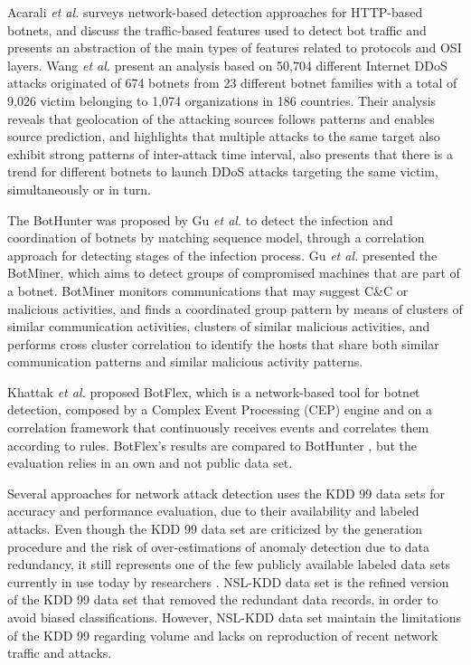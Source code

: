Acarali \emph{et al.} \cite{acarali2016survey} surveys network-based detection approaches for HTTP-based botnets, and discuss the traffic-based features used to detect bot traffic and presents an abstraction of the main types of features related to protocols and OSI layers. Wang \emph{et al.} \cite{Wang2018ddosbotnetssurvey} present an analysis based on 50,704 different Internet DDoS attacks originated of 674 botnets from 23 different botnet families with a total of 9,026 victim belonging to 1,074 organizations in 186 countries. Their analysis reveals that geolocation of the attacking sources follows patterns and enables source prediction, and highlights that multiple attacks to the same target also exhibit strong patterns of inter-attack time interval, also presents that there is a trend for different botnets to launch DDoS attacks targeting the same victim, simultaneously or in turn.

The BotHunter was proposed by Gu \emph{et al.} \cite{gu2007bothunter} to detect the infection and coordination of botnets by matching sequence model, through a correlation approach for detecting stages of the infection process.  Gu \emph{et al.} \cite{gu2008botminer} presented the BotMiner, which aims to detect groups of compromised machines that are part of a botnet. BotMiner monitors communications that may suggest C\&C or malicious activities, and finds a coordinated group pattern by means of clusters of similar communication activities, clusters of similar malicious activities, and performs cross cluster correlation to identify the hosts that share both similar communication patterns and similar malicious activity patterns.

Khattak \emph{et al.} \cite{khattak2015botflex} proposed BotFlex, which is a network-based tool for botnet detection, composed by a Complex Event Processing (CEP) engine and on a correlation framework that continuously receives events and correlates them according to rules. BotFlex's results are compared to BotHunter \cite{gu2007bothunter}, but the evaluation relies in an own and not public data set.

Several approaches for network attack detection uses the KDD 99 \cite{ahmed2016survey,osanaiye2016distributed,bhuyan2014network} data sets for accuracy and performance evaluation, due to their availability and labeled attacks. Even though the KDD 99 data set are criticized by the generation procedure and the risk of over-estimations of anomaly detection due to data redundancy, it still represents one of the few publicly available labeled data sets currently in use today by researchers \cite{osanaiye2016distributed,bhuyan2014network}. NSL-KDD \cite{tavallaee2009detailed} data set is the refined version of the KDD 99 data set that removed the redundant data records, in order to avoid biased classifications. However, NSL-KDD data set maintain the limitations of the KDD 99 regarding volume and lacks on reproduction of recent network traffic and attacks.

